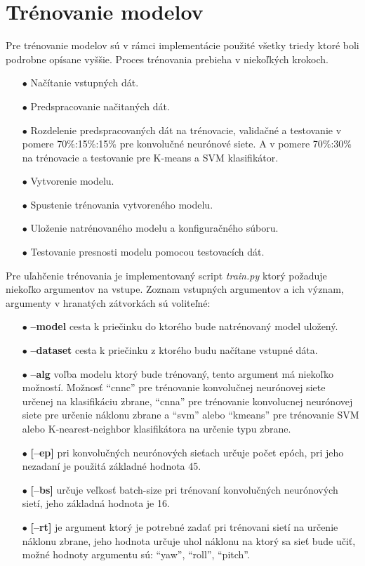 
\section{Trénovanie modelov}
\label{sec:trenovanie}
Pre trénovanie modelov sú v rámci implementácie použité všetky triedy ktoré boli podrobne opísane vyššie.
Proces trénovania prebieha v niekoľkých krokoch.
\begin{enumerate}
    \item[$\bullet$] Načítanie vstupných dát.
    \item[$\bullet$] Predspracovanie načitaných dát.
    \item[$\bullet$] Rozdelenie predspracovaných dát na trénovacie, validačné a testovanie v pomere 70\%:15\%:15\% pre konvolučné neurónové siete.
    A v pomere 70\%:30\% na trénovacie a testovanie pre K-means a SVM klasifikátor.
    \item[$\bullet$] Vytvorenie modelu.
    \item[$\bullet$] Spustenie trénovania vytvoreného modelu.
    \item[$\bullet$] Uloženie natrénovaného modelu a konfiguračného súboru.
    \item[$\bullet$] Testovanie presnosti modelu pomocou testovacích dát.
\end{enumerate}

Pre uľahčenie trénovania je implementovaný script \textit{train.py} ktorý požaduje niekoľko argumentov na vstupe.
Zoznam vstupných argumentov a ich význam, argumenty v hranatých zátvorkách sú voliteľné:
\begin{enumerate}
  \item[$\bullet$] \textbf{--model} cesta k priečinku do ktorého bude natrénovaný model uložený.
  \item[$\bullet$] \textbf{--dataset} cesta k priečinku z ktorého budu načítane vstupné dáta.
  \item[$\bullet$] \textbf{--alg} voľba modelu ktorý bude trénovaný, tento argument má niekoľko možností.
  Možnosť ``cnnc'' pre trénovanie konvolučnej neurónovej siete určenej na klasifikáciu zbrane,
  ``cnna'' pre trénovanie konvolucnej neurónovej siete pre určenie náklonu zbrane a
  ``svm'' alebo ``kmeans'' pre trénovanie SVM alebo K-nearest-neighbor klasifikátora na určenie typu zbrane.
  \item[$\bullet$] \textbf{[--ep]} pri konvolučných neurónových sieťach určuje počet epóch, pri jeho nezadaní je použitá
  základné hodnota 45.
  \item[$\bullet$] \textbf{[--bs]} určuje veľkosť batch-size pri trénovaní konvolučných neurónových sietí, jeho
  základná hodnota je 16.
  \item[$\bullet$] \textbf{[--rt]} je argument ktorý je potrebné zadať pri trénovani sietí na určenie náklonu zbrane,
  jeho hodnota určuje uhol náklonu na ktorý sa sieť bude učiť, možné hodnoty argumentu sú: ``yaw'', ``roll'', ``pitch''.
\end{enumerate}

